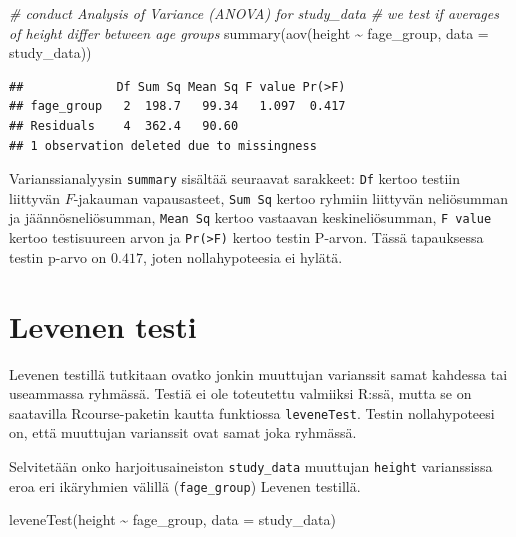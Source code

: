 \documentclass[
]{book}
\newenvironment{Shaded}{\begin{snugshade}}{\end{snugshade}}
\newcommand{\AttributeTok}[1]{\textcolor[rgb]{0.77,0.63,0.00}{#1}}
\newcommand{\CommentTok}[1]{\textcolor[rgb]{0.56,0.35,0.01}{\textit{#1}}}
\newcommand{\FunctionTok}[1]{\textcolor[rgb]{0.00,0.00,0.00}{#1}}
\newcommand{\NormalTok}[1]{#1}
\newcommand{\SpecialCharTok}[1]{\textcolor[rgb]{0.00,0.00,0.00}{#1}}
\begin{document}
\begin{Shaded}
\begin{Highlighting}[]
\CommentTok{\# conduct Analysis of Variance (ANOVA) for study\_data}
\CommentTok{\# we test if averages of height differ between age groups}
\FunctionTok{summary}\NormalTok{(}\FunctionTok{aov}\NormalTok{(height }\SpecialCharTok{\textasciitilde{}}\NormalTok{ fage\_group, }\AttributeTok{data =}\NormalTok{ study\_data))}
\end{Highlighting}
\end{Shaded}

\begin{verbatim}
##             Df Sum Sq Mean Sq F value Pr(>F)
## fage_group   2  198.7   99.34   1.097  0.417
## Residuals    4  362.4   90.60               
## 1 observation deleted due to missingness
\end{verbatim}

Varianssianalyysin \texttt{summary} sisältää seuraavat sarakkeet: \texttt{Df} kertoo testiin liittyvän \(F\)-jakauman vapausasteet, \texttt{Sum\ Sq} kertoo ryhmiin liittyvän neliösumman ja jäännösneliösumman, \texttt{Mean\ Sq} kertoo vastaavan keskineliösumman, \texttt{F\ value} kertoo testisuureen arvon ja \texttt{Pr(\textgreater{}F)} kertoo testin P-arvon. Tässä tapauksessa testin p-arvo on \(0.417\), joten nollahypoteesia ei hylätä.

\hypertarget{levene}{%
\section{Levenen testi}\label{levene}}

Levenen testillä tutkitaan ovatko jonkin muuttujan varianssit samat kahdessa tai useammassa ryhmässä. Testiä ei ole toteutettu valmiiksi R:ssä, mutta se on saatavilla Rcourse-paketin kautta funktiossa \texttt{leveneTest}. Testin nollahypoteesi on, että muuttujan varianssit ovat samat joka ryhmässä.

Selvitetään onko harjoitusaineiston \texttt{study\_data} muuttujan \texttt{height} varianssissa eroa eri ikäryhmien välillä (\texttt{fage\_group}) Levenen testillä.

\begin{Shaded}
\begin{Highlighting}[]
\FunctionTok{leveneTest}\NormalTok{(height }\SpecialCharTok{\textasciitilde{}}\NormalTok{ fage\_group, }\AttributeTok{data =}\NormalTok{ study\_data)}
\end{Highlighting}
\end{Shaded}
\end{document}
